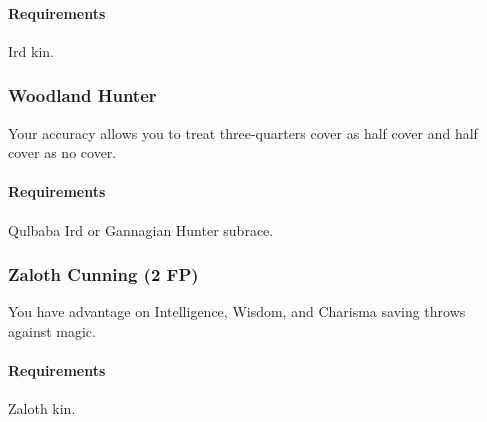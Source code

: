     \paragraph{Requirements} Ird kin.
\subsubsection{Woodland Hunter} \label{feat::woodlandhunter}
    Your accuracy allows you to treat three-quarters cover as half cover and half cover as no cover.
    \paragraph{Requirements} Qulbaba Ird or Gannagian Hunter subrace.
\subsubsection{Zaloth Cunning (2 FP)} \label{feat::zalothcunning}
    You have advantage on Intelligence, Wisdom, and Charisma saving throws against magic.
    \paragraph{Requirements} Zaloth kin.
